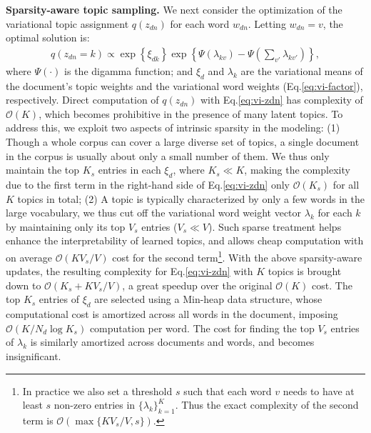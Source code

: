 \documentclass[sigconf]{acmart}
\renewcommand*{\bm}[1]{#1}%
\begin{document}
{\bf Sparsity-aware topic sampling. }
We next consider the optimization of the variational topic assignment $q(z_{dn})$ for each word $w_{dn}$. Letting $w_{dn}=v$, the optimal solution is:
\begin{equation}
\begin{split}
q(z_{dn}=k) \propto \exp\left\{ \bm{\xi}_{dk} \right\}
\exp\left\{ \Psi(\lambda_{kv}) - \Psi\left(\sum\nolimits_{v'}\lambda_{kv'}\right) \right\},
\end{split}
\label{eq:vi-zdn}
\end{equation}
where $\Psi(\cdot)$ is the digamma function; and $\bm{\xi}_d$ and $\bm{\lambda}_k$ are the variational means of the document's topic weights and the variational word weights (Eq.\eqref{eq:vi-factor}), respectively. Direct computation of $q(z_{dn})$ with Eq.\eqref{eq:vi-zdn} has complexity of $\mathcal{O}(K)$, which becomes prohibitive in the presence of many latent topics. To address this, we exploit two aspects of intrinsic sparsity in the modeling: (1) Though a whole corpus can cover a large diverse set of topics, a single document in the corpus is usually about only a small number of them. We thus only maintain the top $K_s$ entries in each $\bm{\xi}_d$, where $K_s \ll K$, 
making the complexity due to the first term in the right-hand side of Eq.\eqref{eq:vi-zdn} only $\mathcal{O}(K_s)$ for all $K$ topics in total; 
(2) A topic is typically characterized by only a few words in the large vocabulary, we thus cut off the variational word weight vector $\bm{\lambda}_k$ for each $k$ by maintaining only its top $V_s$ entries ($V_s \ll V$). Such sparse treatment helps enhance the interpretability of learned topics, 
and allows cheap computation with on average $\mathcal{O}(KV_s/V)$ cost for the second term\footnote{In practice we also set a threshold $s$ such that each word $v$ needs to have at least $s$ non-zero entries in $\{\lambda_{k}\}_{k=1}^{K}$. Thus the exact complexity of the second term is $\mathcal{O}(\max\{KV_s/V, s\})$.}.
With the above sparsity-aware updates, the resulting complexity for Eq.\eqref{eq:vi-zdn} with $K$ topics is brought down to  $\mathcal{O}(K_s+KV_s/V)$, a great speedup over the original $\mathcal{O}(K)$ cost. The top $K_s$ entries of $\bm{\xi}_d$ are selected using a Min-heap data structure, whose computational cost is amortized across all words in the document, imposing $\mathcal{O}(K/N_d\log K_s)$ computation per word. The cost for finding the top $V_s$ entries of $\bm{\lambda}_k$ is similarly amortized across documents and words, and becomes insignificant.
\end{document}
